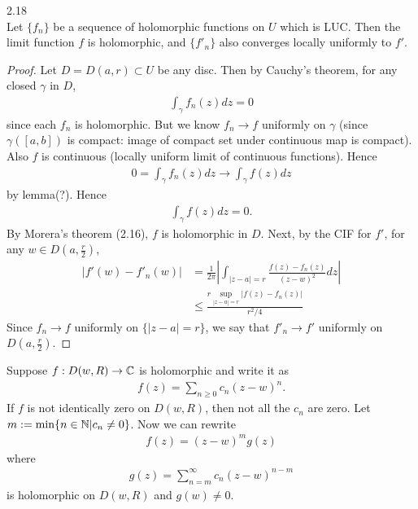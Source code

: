 \documentclass[a4paper]{article}
\begin{document}
\begin{thm} 2.18\\
Let $\{f_n\}$ be a sequence of holomorphic functions on $U$ which is LUC. Then the limit function $f$ is holomorphic, and $\{f'_n\}$ also converges locally uniformly to $f'$.
\begin{proof}
Let $D=D(a,r) \subset U$ be any disc. Then by Cauchy's theorem, for any closed $\gamma$ in $D$,
\begin{equation*}
\begin{aligned}
\int_\gamma f_n(z) dz = 0
\end{aligned}
\end{equation*}
since each $f_n$ is holomorphic. But we know $f_n \to f$ uniformly on $\gamma$ (since $\gamma([a,b])$ is compact: image of compact set under continuous map is compact). Also $f$ is continuous (locally uniform limit of continuous functions). Hence
\begin{equation*}
\begin{aligned}
0=\int_\gamma f_n(z) dz \to \int_\gamma f(z) dz
\end{aligned}
\end{equation*}
by lemma(?). Hence
\begin{equation*}
\begin{aligned}
\int_\gamma f(z) dz = 0.
\end{aligned}
\end{equation*}
By Morera's theorem (2.16), $f$ is holomorphic in $D$. Next, by the CIF for $f'$, for any $w \in D(a,\frac{r}{2})$,
\begin{equation*}
\begin{aligned}
|f'(w) - f'_n(w)| &= \frac{1}{2\pi} \left| \int_{|z-a|=r} \frac{f(z)-f_n(z)}{(z-w)^2} dz\right|\\
&\leq \frac{r \sup_{|z-a|=r} |f(z)-f_n(z)|}{r^2/4}
\end{aligned}
\end{equation*}
Since $f_n \to f$ uniformly on $\{|z-a|=r\}$, we say that $f'_n \to f'$ uniformly on $D(a,\frac{r}{2})$.
\end{proof}
\end{thm}

Suppose $f:D(w,R) \to \mathbb{C}$ is holomorphic and write it as
\begin{equation*}
\begin{aligned}
f(z) = \sum_{n\geq 0} c_n (z-w)^n.
\end{aligned}
\end{equation*}
If $f$ is not identically zero on $D(w,R)$, then not all the $c_n$ are zero. Let $m:=\min \{n \in \mathbb{N} | c_n \neq 0\}$. Now we can rewrite
\begin{equation*}
\begin{aligned}
f(z)= (z-w)^m g(z)
\end{aligned}
\end{equation*}
where
\begin{equation*}
\begin{aligned}
g(z) =\sum_{n=m}^\infty c_n (z-w)^{n-m}
\end{aligned}
\end{equation*}
is holomorphic on $D(w,R)$ and $g(w) \neq 0$.
\end{document}
